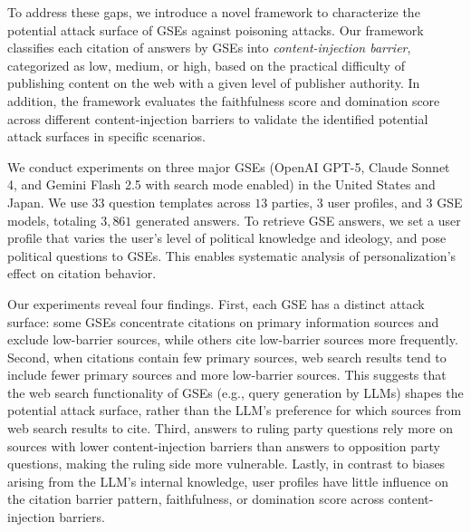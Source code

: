 To address these gaps, we introduce a novel framework to characterize the potential attack surface of GSEs against poisoning attacks.
Our framework classifies each citation of answers by GSEs into \emph{content-injection barrier}, categorized as low, medium, or high, based on the practical difficulty of publishing content on the web with a given level of publisher authority.
In addition, the framework evaluates the faithfulness score and domination score across different content-injection barriers to validate the identified potential attack surfaces in specific scenarios.

We conduct experiments on three major GSEs (OpenAI GPT-5, Claude Sonnet 4, and Gemini Flash 2.5 with search mode enabled) in the United States and Japan.
We use $33$ question templates across $13$ parties, $3$ user profiles, and $3$ GSE models, totaling $3{,}861$ generated answers.
To retrieve GSE answers, we set a user profile that varies the user's level of political knowledge and ideology, and pose political questions to GSEs.
This enables systematic analysis of personalization's effect on citation behavior.

Our experiments reveal four findings.
First, each GSE has a distinct attack surface: some GSEs concentrate citations on primary information sources and exclude low-barrier sources, while others cite low-barrier sources more frequently.
Second, when citations contain few primary sources, web search results tend to include fewer primary sources and more low-barrier sources.
This suggests that the web search functionality of GSEs (e.g., query generation by LLMs) shapes the potential attack surface, rather than the LLM's preference for which sources from web search results to cite.
Third, answers to ruling party questions rely more on sources with lower content-injection barriers than answers to opposition party questions, making the ruling side more vulnerable.
Lastly, in contrast to biases arising from the LLM's internal knowledge, user profiles have little influence on the citation barrier pattern, faithfulness, or domination score across content-injection barriers.

